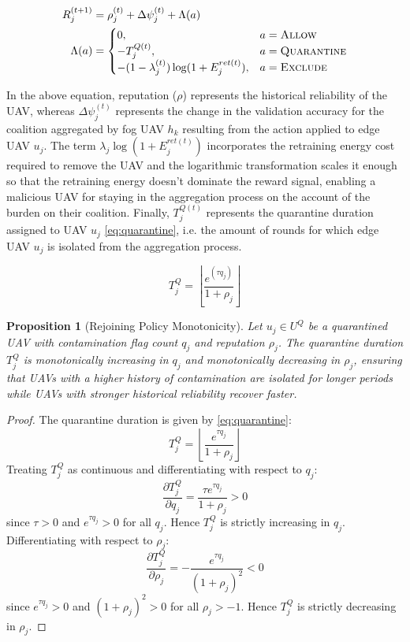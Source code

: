 \documentclass[10pt,journal,compsoc]{IEEEtran}
\newtheorem{propo}{Proposition}
\begin{document}
\begin{align}\label{eq:reward}
R_j^{(t+1)} &=
\rho_j^{(t)} + \Delta \psi_j^{(t)} + \Lambda(a)\\
\Lambda(a) &=
\begin{cases}
0, & a=\textsc{Allow} \\
- T_j^{Q(t)}, & a=\textsc{Quarantine} \\
- (1-\lambda_j^{(t)})\log(1+E_j^{ret(t)}), & a=\textsc{Exclude}
\end{cases}
\end{align}

In the above equation, reputation ($\rho$) represents the historical reliability of the UAV, whereas $\Delta \psi^{(t)}_j$ represents the change in the validation accuracy for the coalition aggregated by fog UAV $h_k$ resulting from the action applied to edge UAV $u_j$.
The term $\lambda_j \log(1 + E_j^{ret (t)})$ incorporates the retraining energy cost required to remove the UAV and the logarithmic transformation scales it enough so that the retraining energy doesn't dominate the reward signal, enabling a malicious UAV for staying in the aggregation process on the account of the burden on their coalition.
Finally, $T_j^{Q(t)}$ represents the quarantine duration assigned to UAV $u_j$ \eqref{eq:quarantine}, i.e. the amount of rounds for which edge UAV $u_j$ is isolated from the aggregation process.

\begin{equation}\label{eq:quarantine}
T_j^Q
=
\left\lfloor
\frac{e^{(\tau q_j)}}{1 + \rho_j}
\right\rfloor
\end{equation}

\begin{propo}[Rejoining Policy Monotonicity]
Let $u_j \in U^Q$ be a quarantined UAV with 
contamination flag count $q_j$ and reputation $\rho_j$. 
The quarantine duration $T_j^Q$ is monotonically increasing 
in $q_j$ and monotonically decreasing in $\rho_j$, ensuring 
that UAVs with a higher history of contamination are isolated 
for longer periods while UAVs with stronger historical 
reliability recover faster.
\end{propo}

\begin{proof}
The quarantine duration is given by \eqref{eq:quarantine}:
\[
T_j^Q = \left\lfloor \frac{e^{\tau q_j}}{1 + \rho_j} \right\rfloor
\]
Treating $T_j^Q$ as continuous and differentiating with 
respect to $q_j$:
\[
\frac{\partial T_j^Q}{\partial q_j} 
= \frac{\tau e^{\tau q_j}}{1 + \rho_j} > 0
\]
since $\tau > 0$ and $e^{\tau q_j} > 0$ for all $q_j$. 
Hence $T_j^Q$ is strictly increasing in $q_j$.
Differentiating with respect to $\rho_j$:
\[
\frac{\partial T_j^Q}{\partial \rho_j} 
= -\frac{e^{\tau q_j}}{(1 + \rho_j)^2} < 0
\]
since $e^{\tau q_j} > 0$ and $(1+\rho_j)^2 > 0$ for all 
$\rho_j > -1$. Hence $T_j^Q$ is strictly decreasing 
in $\rho_j$.
\end{proof}
\end{document}
